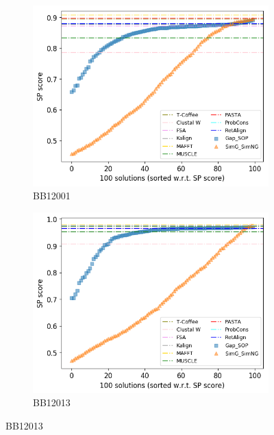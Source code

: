 \begin{figure}[!htbp]
	\centering
	\begin{adjustwidth}{-1cm}{-1cm}
		\begin{subfigure}{0.22\textwidth}
			\includegraphics[width=\columnwidth]{Figure/summary/precomputedInit/Balibase/BB12001_pairs_density_single_run_2}
			\caption{BB12001}
		\end{subfigure}	
		\begin{subfigure}{0.22\textwidth}
			\includegraphics[width=\columnwidth]{Figure/summary/precomputedInit/Balibase/BB12013_pairs_density_single_run_2}
			\caption{BB12013}
		\end{subfigure}

\end{adjustwidth}
\end{figure}
